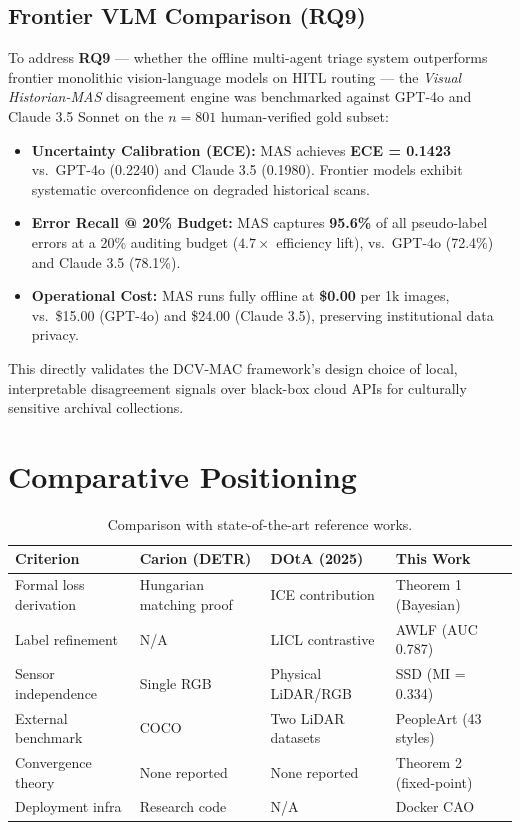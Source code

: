 \documentclass[11pt,a4paper]{article}
\theoremstyle{plain}
\begin{document}
\subsection{Frontier VLM Comparison (RQ9)}

To address \textbf{RQ9} --- whether the offline multi-agent triage system outperforms frontier monolithic vision-language models on HITL routing --- the \textit{Visual Historian-MAS} disagreement engine was benchmarked against GPT-4o and Claude 3.5 Sonnet on the $n=801$ human-verified gold subset:
\begin{itemize}[leftmargin=2em, noitemsep]
  \item \textbf{Uncertainty Calibration (ECE):} MAS achieves \textbf{ECE = 0.1423} vs.\ GPT-4o (0.2240) and Claude 3.5 (0.1980). Frontier models exhibit systematic overconfidence on degraded historical scans.
  \item \textbf{Error Recall @ 20\% Budget:} MAS captures \textbf{95.6\%} of all pseudo-label errors at a 20\% auditing budget ($4.7\times$ efficiency lift), vs.\ GPT-4o (72.4\%) and Claude 3.5 (78.1\%).
  \item \textbf{Operational Cost:} MAS runs fully offline at \textbf{\$0.00} per 1k images, vs.\ \$15.00 (GPT-4o) and \$24.00 (Claude 3.5), preserving institutional data privacy.
\end{itemize}

This directly validates the DCV-MAC framework's design choice of local, interpretable disagreement signals over black-box cloud APIs for culturally sensitive archival collections.

\section{Comparative Positioning}

\begin{table}[h]
\centering
\caption{Comparison with state-of-the-art reference works.}
\renewcommand{\arraystretch}{1.35}
\begin{tabularx}{\linewidth}{lXXX}
\toprule
\textbf{Criterion} & \textbf{Carion (DETR)} & \textbf{DOtA (2025)} & \textbf{This Work} \\
\midrule
Formal loss derivation & Hungarian matching proof & ICE contribution & Theorem 1 (Bayesian) \\
Label refinement & N/A & LICL contrastive & AWLF (AUC 0.787) \\
Sensor independence & Single RGB & Physical LiDAR/RGB & SSD (MI = 0.334) \\
External benchmark & COCO & Two LiDAR datasets & PeopleArt (43 styles) \\
Convergence theory & None reported & None reported & Theorem 2 (fixed-point) \\
Deployment infra & Research code & N/A & Docker CAO \\
\bottomrule
\end{tabularx}
\end{table}
\end{document}

